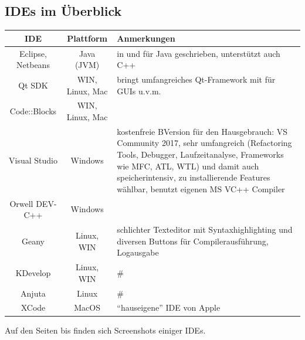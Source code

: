 \documentclass[a4paper]{report}
\begin{document}
\subsection{IDEs im Überblick}
\begin{center}
\begin{tabular}{|c|c|p{10cm}|}
	\hline
	\textbf{IDE} & \textbf{Plattform} & \textbf{Anmerkungen}\\
	\hline
	Eclipse, Netbeans & Java (JVM) & in und für Java geschrieben, unterstützt auch C++ \\
	Qt SDK & WIN, Linux, Mac & bringt umfangreiches Qt-Framework mit für GUIs u.v.m. \\
	Code::Blocks & WIN, Linux, Mac & \\
	\hline
	Visual Studio & Windows & kostenfreie BVersion für den Hausgebrauch: VS Community 2017, sehr umfangreich (Refactoring Tools, Debugger, Laufzeitanalyse, Frameworks wie MFC, ATL, WTL) und damit auch speicherintensiv, zu installierende Features wählbar, benutzt eigenen MS VC++ Compiler\\
	Orwell DEV-C++ & Windows &\\
	\hline
	Geany & Linux, WIN & schlichter Texteditor mit Syntaxhighlighting und diversen Buttons für Compilerausführung, Logausgabe\\
	KDevelop & Linux, WIN & \# \\ %
	Anjuta & Linux & \# \\ %
	\hline
	XCode & MacOS & "`hauseigene"' IDE von Apple\\
	\hline
	
\end{tabular}

\vspace{4ex}

Auf den Seiten \pageref{begin:ide:picts} bis \pageref{end:ide:picts} finden sich Screenshots einiger IDEs.


\end{center}
\end{document}
